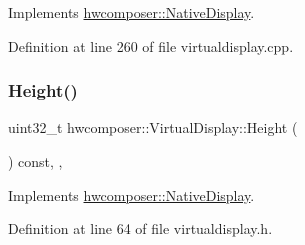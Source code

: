 Implements \mbox{\hyperlink{classhwcomposer_1_1NativeDisplay_aaf80095ae6aed35c64dd633a6a2f101a}{hwcomposer\+::\+Native\+Display}}.



Definition at line 260 of file virtualdisplay.\+cpp.


\begin{DoxyCode}{0}
\end{DoxyCode}
\mbox{\label{classhwcomposer_1_1VirtualDisplay_a7136ba46d348b88dae1908a928e6ce2d}} 
\subsubsection{\texorpdfstring{Height()}{Height()}}
{\footnotesize\ttfamily uint32\+\_\+t hwcomposer\+::\+Virtual\+Display\+::\+Height (\begin{DoxyParamCaption}{ }\end{DoxyParamCaption}) const\hspace{0.3cm}{\ttfamily [inline]}, {\ttfamily [override]}, {\ttfamily [virtual]}}



Implements \mbox{\hyperlink{classhwcomposer_1_1NativeDisplay_a09a19377e64e1fed90ae8315a8e71864}{hwcomposer\+::\+Native\+Display}}.



Definition at line 64 of file virtualdisplay.\+h.


\begin{DoxyCode}{0}
\end{DoxyCode}
\mbox{\label{classhwcomposer_1_1VirtualDisplay_a86d1fb5bdab8aa74d11d223313fb4fd0}} 
